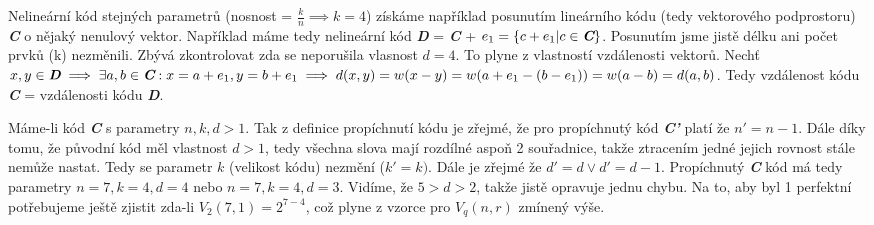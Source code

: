 \documentclass[12pt, a4paper]{article}
\begin{document}
Nelineární kód stejných parametrů (nosnost = $\frac{k}{n} \implies k=4$) získáme například posunutím lineárního kódu (tedy vektorového podprostoru) \textit{\textbf{C}} o nějaký nenulový vektor. Například máme tedy nelineární kód \textit{\textbf{D}} = \textit{\textbf{C}} + $e_1 = \{c + e_1 | c \in \textit{\textbf{C}}\}$. Posunutím jsme jistě délku ani počet prvků (k) nezměnili. Zbývá zkontrolovat zda se neporušila vlasnost $d=4$. To plyne z vlastností vzdálenosti vektorů. Nechť $x,y \in \textit{\textbf{D}} \implies \exists a,b \in \textit{\textbf{C}} : x=a+e_1, y=b+e_1 \implies d(x,y) = w(x-y) = w(a+e_1-(b-e_1))=w(a-b)=d(a,b)$. Tedy vzdálenost kódu \textit{\textbf{C}} = vzdálenosti kódu \textit{\textbf{D}}.

Máme-li kód \textit{\textbf{C}} s parametry $n,k,d>1$. Tak z definice propíchnutí kódu je zřejmé, že pro propíchnutý kód \textit{\textbf{C'}} platí že $n'=n-1$. Dále díky tomu, že původní kód měl vlastnost $d>1$, tedy všechna slova mají rozdílné aspoň 2 souřadnice, takže ztracením jedné jejich rovnost stále nemůže nastat. Tedy se parametr $k$ (velikost kódu) nezmění ($k'=k)$. Dále je zřejmé že $d'= d \vee d'=d-1$. Propíchnutý \textit{\textbf{C}} kód má tedy parametry $n=7,k=4,d=4$ nebo $n=7,k=4,d=3$. Vidíme, že $5>d>2$, takže jistě opravuje jednu chybu. Na to, aby byl 1 perfektní potřebujeme ještě zjistit zda-li $V_{2}(7,1)=2^{7-4}$, což plyne z vzorce pro $V_{q}(n,r)$ zmínený výše.
\end{document}
